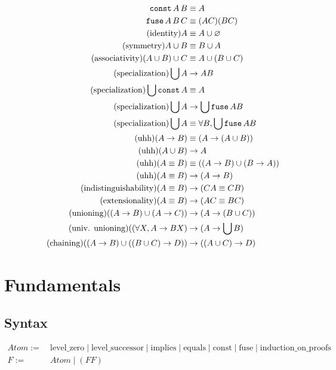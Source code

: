 \documentclass{article}
\begin{document}
  \begin{align*}
    \operatorname{\texttt{const}} A\,B &\equiv A\\
    \operatorname{\texttt{fuse}} A\,B\,C &\equiv (AC)(BC)\\
    \tag{identity}
    A &\equiv A \cup \varnothing\\
    \tag{symmetry}
    A \cup B &\equiv B \cup A\\
    \tag{associativity}
    (A \cup B) \cup C &\equiv A \cup (B \cup C)\\
    \tag{specialization}
    \bigcup A &\to A B\\
    \tag{specialization}
    \bigcup \operatorname{\texttt{const}} A &\equiv A\\
    \tag{specialization}
    \bigcup A &\to \bigcup \operatorname{\texttt{fuse}} A B\\
    \tag{specialization}
    \bigcup A &\equiv \forall B, \bigcup \operatorname{\texttt{fuse}} A B\\
    \tag{uhh}
    (A \to B) &\equiv (A \to (A \cup B))\\
    \tag{uhh}
    (A \cup B) &\to A\\
    \tag{uhh}
    (A \equiv B) &\equiv ((A \to B) \cup (B \to A))\\
    \tag{uhh}
    (A \equiv B) &\to (A \to B)\\
    \tag{indistinguishability}
    (A \equiv B) &\to (CA \equiv CB)\\
    \tag{extensionality}
    (A \equiv B) &\to (AC \equiv BC)\\
    \tag{unioning}
    ((A \to B) \cup (A \to C)) &\to (A \to (B \cup C))\\
    \tag{univ. unioning}
    ((\forall X, A \to B X) &\to (A \to \bigcup B)\\
    \tag{chaining}
    ((A \to B) \cup ((B \cup C) \to D)) &\to ((A \cup C) \to D)\\
  \end{align*}

  
  
  \section{Fundamentals}\label{fundamentals}

  \subsection{Syntax}
  \begin{align*}
     Atom :=&\ \mathrm{level\_zero} \mid \mathrm{level\_successor} \mid \mathrm{implies} \mid \mathrm{equals} \mid \mathrm{const} \mid \mathrm{fuse} \mid \mathrm{induction\_on\_proofs}\\
     F :=&\ Atom \mid (F F)
  \end{align*}
\end{document}
